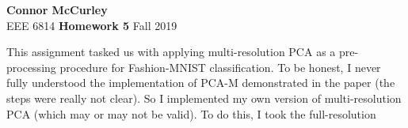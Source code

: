 \documentclass{article}[12 pt]
\begin{document}
	
\begin{center}
	\textbf{\Large Connor McCurley} \\
	EEE 6814 \qquad \textbf{\large Homework 5} \qquad Fall 2019 
\end{center}


This assignment tasked us with applying multi-resolution PCA as a pre-processing procedure for Fashion-MNIST classification. To be honest, I never fully understood the implementation of PCA-M demonstrated in the paper (the steps were really not clear). So I implemented my own version of multi-resolution PCA (which may or may not be valid).   To do this, I took the full-resolution 

%
%
\end{document}

